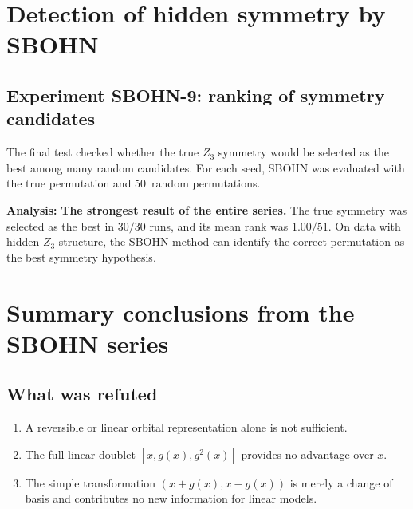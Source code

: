 \documentclass[11pt,a4paper]{report}
\begin{document}

\section{Detection of hidden symmetry by SBOHN}

\subsection{Experiment SBOHN-9: ranking of symmetry candidates}

The final test checked whether the true $Z_3$ symmetry would be selected as
the best among many random candidates. For each seed, SBOHN was evaluated
with the true permutation and 50~random permutations.

\noindent{}


\noindent{}


\textbf{Analysis:} \textbf{The strongest result of the entire series.} The true symmetry
was selected as the best in $30/30$ runs, and its mean rank
was $1.00/51$. On data with hidden $Z_3$ structure, the SBOHN method can
identify the correct permutation as the best symmetry hypothesis.


\section{Summary conclusions from the SBOHN series}

\subsection{What was refuted}

\begin{enumerate}[label=\arabic*.]
\item A reversible or linear orbital representation alone is not sufficient.
\item The full linear doublet $[x,g(x),g^2(x)]$ provides no advantage over $x$.
\item The simple transformation $(x+g(x),x-g(x))$ is merely a change of basis and contributes
no new information for linear models.
\end{enumerate}
\end{document}
